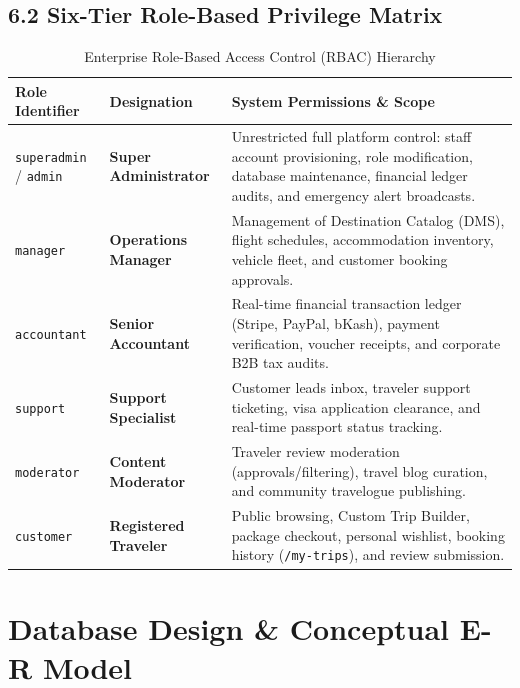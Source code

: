 \documentclass[11pt,a4paper]{article}
\begin{document}
\subsection{6.2 Six-Tier Role-Based Privilege Matrix}
\begin{table}[H]
\centering
\footnotesize
\begin{tabularx}{\textwidth}{l p{3.2cm} X}
\toprule
\textbf{Role Identifier} & \textbf{Designation} & \textbf{System Permissions \& Scope} \\
\midrule
\texttt{superadmin} / \texttt{admin} & \textbf{Super Administrator} & Unrestricted full platform control: staff account provisioning, role modification, database maintenance, financial ledger audits, and emergency alert broadcasts. \\
\addlinespace
\texttt{manager} & \textbf{Operations Manager} & Management of Destination Catalog (DMS), flight schedules, accommodation inventory, vehicle fleet, and customer booking approvals. \\
\addlinespace
\texttt{accountant} & \textbf{Senior Accountant} & Real-time financial transaction ledger (Stripe, PayPal, bKash), payment verification, voucher receipts, and corporate B2B tax audits. \\
\addlinespace
\texttt{support} & \textbf{Support Specialist} & Customer leads inbox, traveler support ticketing, visa application clearance, and real-time passport status tracking. \\
\addlinespace
\texttt{moderator} & \textbf{Content Moderator} & Traveler review moderation (approvals/filtering), travel blog curation, and community travelogue publishing. \\
\addlinespace
\texttt{customer} & \textbf{Registered Traveler} & Public browsing, Custom Trip Builder, package checkout, personal wishlist, booking history (\texttt{/my-trips}), and review submission. \\
\bottomrule
\end{tabularx}
\caption{Enterprise Role-Based Access Control (RBAC) Hierarchy}
\end{table}

\newpage

\section{Database Design \& Conceptual E-R Model}
\end{document}
